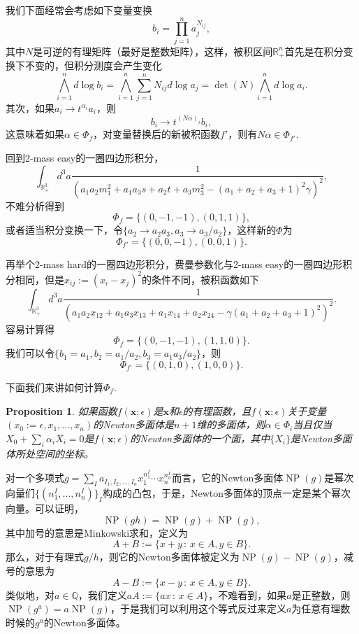 \documentclass[11pt]{article}
\theoremstyle{definition}
\theoremstyle{plain}
\newtheorem{pro}[para]{Proposition}
\begin{document}
我们下面经常会考虑如下变量变换
\[
	b_i=\prod_{j=1}^n a_j^{N_{ij}},
\]
其中$N$是可逆的有理矩阵（最好是整数矩阵），这样，被积区间$\mathbb R_+^n$首先是在积分变换下不变的，但积分测度会产生变化
\[
	\bigwedge_{i=1}^n d\log b_i=\bigwedge_{i=1}^n\sum_{j=1}^n N_{ij}d\log a_j = \det(N) \bigwedge_{i=1}^n d\log a_i.
\]
其次，如果$a_i\to t^{\alpha_i}a_i$，则
\[
	b_i\to t^{(N \alpha)_i} b_i,
\]
这意味着如果$\alpha\in \Phi_f$，对变量替换后的新被积函数$f'$，则有$N \alpha\in \Phi_{f'}$. 


回到2-mass easy的一圈四边形积分，
\[
	\int_{\mathbb R_+^3}d^3a\frac{1}{(a_1a_2 m_1^2+a_1a_3s+a_2t+a_3m_3^2-(a_1+a_2+a_3+1)^2\gamma)^2},
\]
不难分析得到
\[
	\Phi_f=\{(0, -1, -1), (0, 1, 1)\},
\]
或者适当积分变换一下，令$\{a_2\to a_2a_3,a_3\to a_3/a_2\}$，这样新的$\Phi$为
\[
	\Phi_{f'}=\{(0, 0, -1), (0, 0, 1)\}.
\]

再举个2-mass hard的一圈四边形积分，费曼参数化与2-mass easy的一圈四边形积分相同，但是$x_{ij}:=(x_i-x_j)^2$的条件不同，被积函数如下
\[
	\int_{\mathbb R_+^3}d^3a\frac{1}{(a_1 a_2 x_{12}+a_1 a_3 x_{13}+a_1 x_{14}+a_2 x_{24}-\gamma (a_1+a_2+a_3+1)^2)^2}.
\]
容易计算得
\[
	\Phi_f=\{(0,-1,-1),(1,1,0)\}.
\]
我们可以令$\{b_1=a_1,b_2=a_1/a_2,b_3=a_1 a_3/a_2\}$，则
\[
	\Phi_{f'}=\{(0,1,0),(1,0,0)\}.
\]

下面我们来讲如何计算$\Phi_f$. 

\begin{pro}
如果函数$f(\mathbf{x};\epsilon)$是$\mathbf{x}$和$\epsilon$的有理函数，且$f(\mathbf{x};\epsilon)$关于变量$(x_0:=\epsilon,x_1,\dots,x_n)$的Newton多面体是$n+1$维的多面体，则$\alpha\in \Phi_i$当且仅当$X_0+\sum_{i}\alpha_i X_i=0$是$f(\mathbf{x};\epsilon)$的Newton多面体的一个面，其中$\{X_i\}$是Newton多面体所处空间的坐标。
\end{pro}

对一个多项式$g=\sum_I a_{I_1,I_2,\dots,I_n}x_1^{n^I_1}\cdots x_n^{n^I_n}$而言，它的Newton多面体$\operatorname{NP}(g)$是幂次向量们$\{(n^I_1,\dots,n^I_n)\}_I$构成的凸包，于是，Newton多面体的顶点一定是某个幂次向量。可以证明，
\[
	\operatorname{NP}(gh)=\operatorname{NP}(g)+\operatorname{NP}(g),
\]
其中加号的意思是Minkowski求和，定义为
\[
A+B:=\{x+y\,:\,x\in A, y\in B\}.
\]
那么，对于有理式$g/h$，则它的Newton多面体被定义为$\operatorname{NP}(g)-\operatorname{NP}(g)$，减号的意思为
\[
A-B:=\{x-y\,:\,x\in A, y\in B\}.
\]
类似地，对$a\in \mathbb Q$，我们定义$a A:=\{ax\,:\, x\in A\}$，不难看到，如果$a$是正整数，则$\operatorname{NP}(g^a)=a\operatorname{NP}(g)$，于是我们可以利用这个等式反过来定义$a$为任意有理数时候的$g^a$的Newton多面体。
\end{document}
